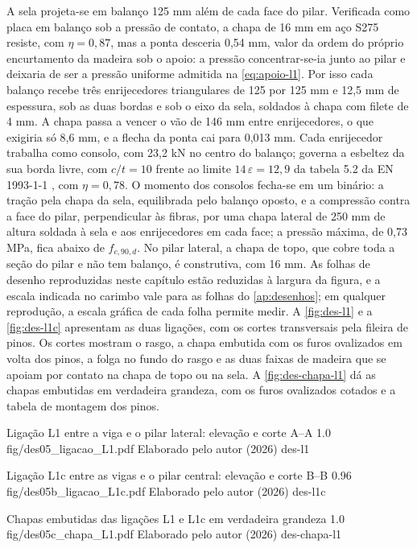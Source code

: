 A sela projeta-se em balanço 125 mm além de cada face do pilar. Verificada como
placa em balanço sob a pressão de contato, a chapa de 16 mm em aço S275 resiste,
com $\eta = 0{,}87$, mas a ponta desceria 0,54 mm, valor da ordem do próprio
encurtamento da madeira sob o apoio: a pressão concentrar-se-ia junto ao pilar e
deixaria de ser a pressão uniforme admitida na \autoref{eq:apoio-l1}. Por isso
cada balanço recebe três enrijecedores triangulares de 125 por 125 mm e 12,5 mm
de espessura, sob as duas bordas e sob o eixo da sela, soldados à chapa com
filete de 4 mm. A chapa passa a vencer o vão de 146 mm entre enrijecedores, o
que exigiria só 8,6 mm, e a flecha da ponta cai para 0,013 mm. Cada enrijecedor
trabalha como consolo, com 23,2 kN no centro do balanço; governa a esbeltez da
sua borda livre, com $c/t = 10$ frente ao limite $14\,\varepsilon = 12{,}9$ da
tabela 5.2 da EN 1993-1-1 \cite{EN1993-1-1:2005}, com $\eta = 0{,}78$. O momento
dos consolos fecha-se em um binário: a tração pela chapa da sela, equilibrada pelo
balanço oposto, e a compressão contra a face do pilar, perpendicular às fibras,
por uma chapa lateral de 250 mm de altura soldada à sela e aos enrijecedores em
cada face; a pressão máxima, de 0,73 MPa, fica abaixo de $f_{c,90,d}$. No pilar
lateral, a chapa de topo, que cobre toda a seção do pilar e não tem balanço, é
construtiva, com 16 mm. As folhas de desenho reproduzidas neste capítulo estão
reduzidas à largura da figura, e a escala indicada no carimbo vale para as folhas
do \autoref{ap:desenhos}; em qualquer reprodução, a escala gráfica de cada folha
permite medir. A \autoref{fig:des-l1} e a \autoref{fig:des-l1c}
apresentam as duas ligações, com os cortes transversais pela fileira de pinos. Os
cortes mostram o rasgo, a chapa embutida com os furos ovalizados em volta dos
pinos, a folga no fundo do rasgo e as duas faixas de madeira que se apoiam por
contato na chapa de topo ou na sela. A \autoref{fig:des-chapa-l1} dá as chapas
embutidas em verdadeira grandeza, com os furos ovalizados cotados e a tabela de
montagem dos pinos.

\figura
{Ligação L1 entre a viga e o pilar lateral: elevação e corte A--A}
{1.0}
{fig/des05_ligacao_L1.pdf}
{Elaborado pelo autor (2026)}
{des-l1}
{}
{}

\figura
{Ligação L1c entre as vigas e o pilar central: elevação e corte B--B}
{0.96}
{fig/des05b_ligacao_L1c.pdf}
{Elaborado pelo autor (2026)}
{des-l1c}
{}
{}

\figura
{Chapas embutidas das ligações L1 e L1c em verdadeira grandeza}
{1.0}
{fig/des05c_chapa_L1.pdf}
{Elaborado pelo autor (2026)}
{des-chapa-l1}
{}
{}

